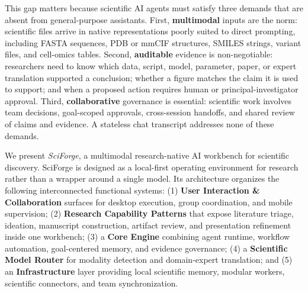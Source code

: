 \documentclass[sn-basic,Numbered,pdflatex]{sn-jnl}
\begin{document}
This gap matters because scientific AI agents must satisfy three demands that are absent from general-purpose assistants. First, \textbf{multimodal} inputs are the norm: scientific files arrive in native representations poorly suited to direct prompting, including FASTA sequences, PDB or mmCIF structures, SMILES strings, variant files, and cell-omics tables. Second, \textbf{auditable} evidence is non-negotiable: researchers need to know which data, script, model, parameter, paper, or expert translation supported a conclusion; whether a figure matches the claim it is used to support; and when a proposed action requires human or principal-investigator approval. Third, \textbf{collaborative} governance is essential: scientific work involves team decisions, goal-scoped approvals, cross-session handoffs, and shared review of claims and evidence. A stateless chat transcript addresses none of these demands.

We present \emph{SciForge}, a multimodal research-native AI workbench for scientific discovery. SciForge is designed as a local-first operating environment for research rather than a wrapper around a single model. Its architecture organizes the following interconnected functional systems: (1) \textbf{User Interaction \& Collaboration} surfaces for desktop execution, group coordination, and mobile supervision; (2) \textbf{Research Capability Patterns} that expose literature triage, ideation, manuscript construction, artifact review, and presentation refinement inside one workbench; (3) a \textbf{Core Engine} combining agent runtime, workflow automation, goal-centered memory, and evidence governance; (4) a \textbf{Scientific Model Router} for modality detection and domain-expert translation; and (5) an \textbf{Infrastructure} layer providing local scientific memory, modular workers, scientific connectors, and team synchronization.
\end{document}
